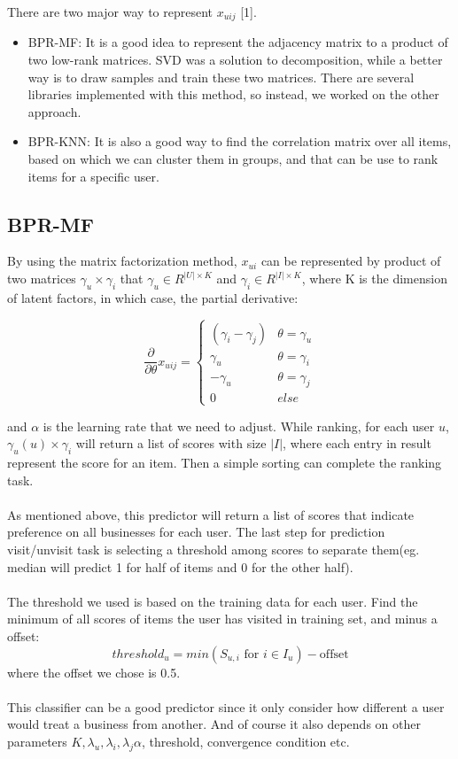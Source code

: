 \documentclass[paper=a4, fontsize=11pt, twocolumn]{scrartcl} %
\numberwithin{equation}{section} %
\numberwithin{figure}{section} %
\numberwithin{table}{section} %
\begin{document}
There are two major way to represent $x_{uij}$ [1]. 
\begin{itemize}
	\item BPR-MF: It is a good idea to represent the adjacency matrix to a product of two low-rank matrices. SVD was a solution to decomposition, while a better way is to draw samples and train these two matrices. There are several libraries implemented with this method, so instead, we worked on the other approach.
	\item BPR-KNN: It is also a good way to find the correlation matrix over all items, based on which we can cluster them in groups, and that can be use to rank items for a specific user.
\end{itemize}

\subsection{BPR-MF}

By using the matrix factorization method, $x_{ui}$ can be represented by product of two matrices $\gamma_u\times\gamma_i$ that $\gamma_u\in R^{|U|\times K}$ and $\gamma_i\in R^{|I|\times K}$, where K is the dimension of latent factors, in which case, the partial derivative:

$$\frac{\partial}{\partial\theta}x_{uij}=\begin{cases}
(\gamma_i-\gamma_j)& \theta=\gamma_u\\
\gamma_u& \theta=\gamma_i\\
-\gamma_u& \theta=\gamma_j\\
0& else
\end{cases}$$

and $\alpha$ is the learning rate that we need to adjust. While ranking, for each user $u$, $\gamma_u(u) \times \gamma_i$ will return a list of scores with size $|I|$, where each entry in result represent the score for an item. Then a simple sorting can complete the ranking task.\\
\\
As mentioned above, this predictor will return a list of scores that indicate preference on all businesses for each user. The last step for prediction visit/unvisit task is selecting a threshold among scores to separate them(eg. median will predict 1 for half of items and 0 for the other half).\\
\\
The threshold we used is based on the training data for each user. Find the minimum of all scores of items the user has visited in training set, and minus a offset:
$$threshold_u = min\left( 
S_{u,i}\text{ for }i \in I_u
\right)-\text{offset}$$
where the offset we chose is 0.5.\\
\\
This classifier can be a good predictor since it only consider how different a user would treat a business from another. And of course it also depends on other parameters $K,\lambda_u,\lambda_i,\lambda_j\alpha$, threshold, convergence condition etc.
\end{document}
